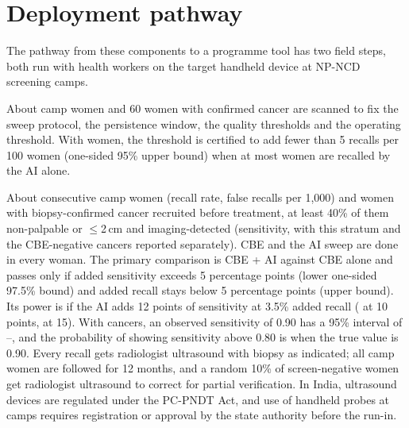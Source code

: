 \section{Deployment pathway}\label{app:pathway}
The pathway from these components to a programme tool has two field steps, both run with health workers on the target handheld device at NP-NCD screening camps.

 About \NPathRunin{} camp women and 60 women with confirmed cancer are scanned to fix the sweep protocol, the persistence window, the quality thresholds and the operating threshold. With \NPathRunin{} women, the threshold is certified to add fewer than 5 recalls per 100 women (one-sided 95\% upper bound) when at most \NPathRuninMaxCount{} women are recalled by the AI alone.

 About \NPathCamp{} consecutive camp women (recall rate, false recalls per 1{,}000) and \NPathCancers{} women with biopsy-confirmed cancer recruited before treatment, at least 40\% of them non-palpable or $\le$2\,cm and imaging-detected (sensitivity, with this stratum and the CBE-negative cancers reported separately). CBE and the AI sweep are done in every woman. The primary comparison is CBE + AI against CBE alone and passes only if added sensitivity exceeds 5 percentage points (lower one-sided 97.5\% bound) and added recall stays below 5 percentage points (upper bound). Its power is \NPathPowerTwelve{} if the AI adds 12 points of sensitivity at 3.5\% added recall (\NPathPowerTen{} at 10 points, \NPathPowerFifteen{} at 15). With \NPathCancers{} cancers, an observed sensitivity of 0.90 has a 95\% interval of \NPathSensCiLo--\NPathSensCiHi, and the probability of showing sensitivity above 0.80 is \NPathPowerSensEighty{} when the true value is 0.90. Every recall gets radiologist ultrasound with biopsy as indicated; all camp women are followed for 12 months, and a random 10\% of screen-negative women get radiologist ultrasound to correct for partial verification. In India, ultrasound devices are regulated under the PC-PNDT Act, and use of handheld probes at camps requires registration or approval by the state authority before the run-in.
